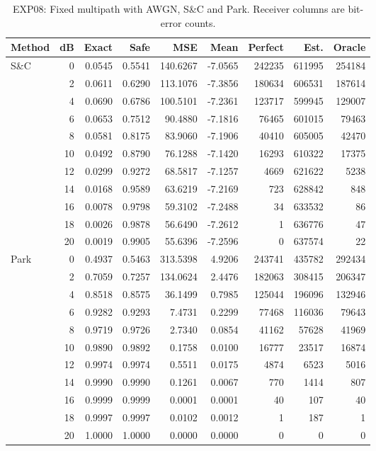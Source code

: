 \begin{table}[!p]
\centering
\caption{EXP08: Fixed multipath with AWGN, S\&C and Park. Receiver columns are bit-error counts.}
\label{app:exp08-1-0}
\small
\setlength{\tabcolsep}{3pt}
\renewcommand{\arraystretch}{1.05}
\begin{tabular}{lrrrrrrrr}
\hline
Method & dB & Exact & Safe & MSE & Mean & Perfect & Est. & Oracle \\
\hline
S\&C & 0 & 0.0545 & 0.5541 & 140.6267 & -7.0565 & 242235 & 611995 & 254184 \\
 & 2 & 0.0611 & 0.6290 & 113.1076 & -7.3856 & 180634 & 606531 & 187614 \\
 & 4 & 0.0690 & 0.6786 & 100.5101 & -7.2361 & 123717 & 599945 & 129007 \\
 & 6 & 0.0653 & 0.7512 & 90.4880 & -7.1816 & 76465 & 601015 & 79463 \\
 & 8 & 0.0581 & 0.8175 & 83.9060 & -7.1906 & 40410 & 605005 & 42470 \\
 & 10 & 0.0492 & 0.8790 & 76.1288 & -7.1420 & 16293 & 610322 & 17375 \\
 & 12 & 0.0299 & 0.9272 & 68.5817 & -7.1257 & 4669 & 621622 & 5238 \\
 & 14 & 0.0168 & 0.9589 & 63.6219 & -7.2169 & 723 & 628842 & 848 \\
 & 16 & 0.0078 & 0.9798 & 59.3102 & -7.2488 & 34 & 633532 & 86 \\
 & 18 & 0.0026 & 0.9878 & 56.6490 & -7.2612 & 1 & 636776 & 47 \\
 & 20 & 0.0019 & 0.9905 & 55.6396 & -7.2596 & 0 & 637574 & 22 \\
\hline
Park & 0 & 0.4937 & 0.5463 & 313.5398 & 4.9206 & 243741 & 435782 & 292434 \\
 & 2 & 0.7059 & 0.7257 & 134.0624 & 2.4476 & 182063 & 308415 & 206347 \\
 & 4 & 0.8518 & 0.8575 & 36.1499 & 0.7985 & 125044 & 196096 & 132946 \\
 & 6 & 0.9282 & 0.9293 & 7.4731 & 0.2299 & 77468 & 116036 & 79643 \\
 & 8 & 0.9719 & 0.9726 & 2.7340 & 0.0854 & 41162 & 57628 & 41969 \\
 & 10 & 0.9890 & 0.9892 & 0.1758 & 0.0100 & 16777 & 23517 & 16874 \\
 & 12 & 0.9974 & 0.9974 & 0.5511 & 0.0175 & 4874 & 6523 & 5016 \\
 & 14 & 0.9990 & 0.9990 & 0.1261 & 0.0067 & 770 & 1414 & 807 \\
 & 16 & 0.9999 & 0.9999 & 0.0001 & 0.0001 & 40 & 107 & 40 \\
 & 18 & 0.9997 & 0.9997 & 0.0102 & 0.0012 & 1 & 187 & 1 \\
 & 20 & 1.0000 & 1.0000 & 0.0000 & 0.0000 & 0 & 0 & 0 \\
\hline
\end{tabular}
\end{table}

